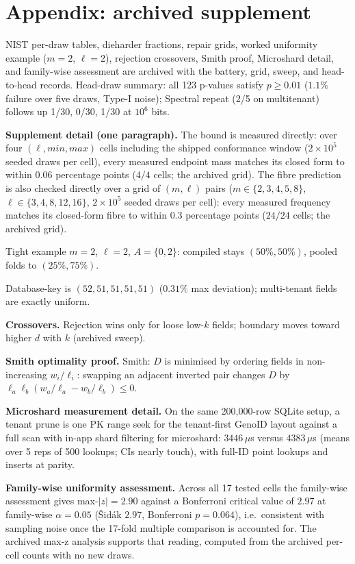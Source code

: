 \documentclass{svproc}
\begin{document}
\section*{Appendix: archived supplement}
NIST per-draw tables, dieharder fractions, repair grids, worked uniformity example ($m=2$, $\ell=2$), rejection crossovers, Smith proof, Microshard detail, and family-wise assessment are archived with the battery, grid, sweep, and head-to-head records. Head-draw summary: all 123 p-values satisfy $p \geq 0.01$ ($1.1\%$ failure over five draws, Type-I noise); Spectral repeat (2/5 on multitenant) follows up 1/30, 0/30, 1/30 at $10^6$ bits.

\noindent\textbf{Supplement detail (one paragraph).}
The bound is measured directly: over four $(\ell,\textit{min},\textit{max})$ cells including the shipped conformance window ($2\times10^5$ seeded draws per cell), every measured endpoint mass matches its closed form to within $0.06$ percentage points ($4/4$ cells; the archived grid). The fibre prediction is also checked directly over a grid of $(m,\ell)$ pairs ($m \in \{2,3,4,5,8\}$, $\ell \in \{3,4,8,12,16\}$, $2\times10^5$ seeded draws per cell): every measured frequency matches its closed-form fibre to within $0.3$ percentage points ($24/24$ cells; the archived grid).

Tight example $m=2$, $\ell=2$, $A=\{0,2\}$: compiled stays $(50\%,50\%)$, pooled folds to $(25\%,75\%)$.

Database-key is $(52,51,51,51,51)$ ($0.31\%$ max deviation); multi-tenant fields are exactly uniform.

\noindent\textbf{Crossovers.} Rejection wins only for loose low-$k$ fields; boundary moves toward higher $d$ with $k$ (archived sweep).

\noindent\textbf{Smith optimality proof.}
Smith: $D$ is minimised by ordering fields in non-increasing $w_i/\ell_i$: swapping an adjacent inverted pair changes $D$ by $\ell_a \ell_b (w_a/\ell_a - w_b/\ell_b) \le 0$.

\noindent\textbf{Microshard measurement detail.}
On the same
200{,}000-row SQLite setup, a tenant prune is one PK range seek for the
tenant-first GenoID layout against a full scan with in-app shard filtering
for microshard:
$3446\,\mu$s versus $4383\,\mu$s (means over 5 reps of 500 lookups; CIs
nearly touch), with full-ID
point lookups and inserts at parity.

\noindent\textbf{Family-wise uniformity assessment.}
Across all 17 tested cells the family-wise assessment gives max-$|z|=2.90$ against a Bonferroni critical value of $2.97$ at family-wise $\alpha=0.05$ (\v{S}id\'ak $2.97$, Bonferroni $p=0.064$), i.e.\ consistent with sampling noise once the 17-fold multiple comparison is accounted for. The archived max-z analysis supports that reading, computed from the archived per-cell counts with no new draws.
\end{document}
